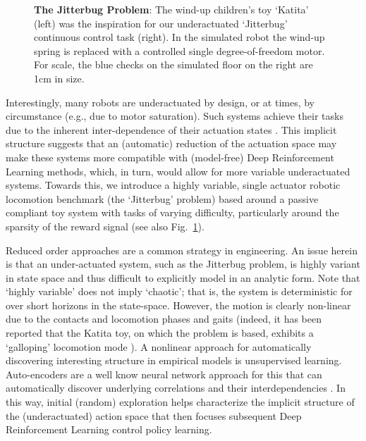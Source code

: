 \documentclass[letterpaper, 10 pt, conference]{ieeeconf}
\begin{document}
\begin{figure}[t]
    \caption{
        \textbf{The Jitterbug Problem}: The wind-up children's toy `Katita' (left) was the inspiration for our underactuated `Jitterbug' continuous control task (right).
        In the simulated robot the wind-up spring is replaced with a controlled single degree-of-freedom motor.
        For scale, the blue checks on the simulated floor on the right are 1cm in size.
    }
    \label{fig:leader}
    
\end{figure} 

Interestingly, many robots are underactuated by design, or at times, by circumstance (e.g., due to motor saturation).
Such systems achieve their tasks due to the inherent inter-dependence of their actuation states \cite{spong1998underactuated}.
This implicit structure suggests that an (automatic) reduction of the actuation space may make these systems more compatible with (model-free) Deep Reinforcement Learning methods, which, in turn, would allow for more variable underactuated systems.
Towards this, we introduce a highly variable, single actuator robotic locomotion benchmark (the `Jitterbug' problem) based around a passive compliant toy system with tasks of varying difficulty, particularly around the sparsity of the reward signal (see also Fig.~\ref{fig:leader}).

Reduced order approaches are a common strategy in engineering.
An issue herein is that an under-actuated system, such as the Jitterbug problem, is highly variant in state space and thus difficult to explicitly model in an analytic form.
Note that `highly variable' does not imply `chaotic'; that is, the system is deterministic for over short horizons in the state-space.
However, the motion is clearly non-linear due to the contacts and locomotion phases and gaits (indeed, it has been reported that the Katita toy, on which the problem is based, exhibits a `galloping' locomotion mode \cite{jgn.thesis}).
A nonlinear approach for automatically discovering interesting structure in empirical models is unsupervised learning.
Auto-encoders are a well know neural network approach for this that can automatically discover underlying correlations and their interdependencies \cite{AE_hinton2006reducing}.
In this way, initial (random) exploration helps characterize the implicit structure of the (underactuated) action space that then focuses subsequent Deep Reinforcement Learning control policy learning.
\end{document}
